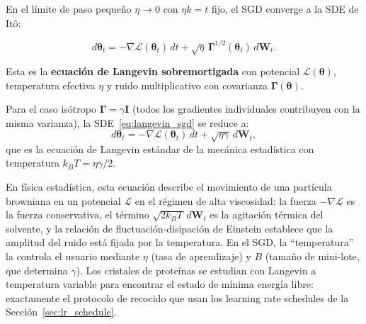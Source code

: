 En el límite de paso pequeño $\eta \to 0$ con $\eta k = t$ fijo, el SGD
converge a la SDE de Itô:

\begin{equation}
  \label{eq:langevin_sgd}
  \boxed{d\bm{\theta}_t
  = -\nabla\mathcal{L}(\bm{\theta}_t)\,dt
  + \sqrt{\eta}\,\bm{\Gamma}^{1/2}(\bm{\theta}_t)\,d\bm{W}_t.}
\end{equation}

Esta es la \textbf{ecuación de Langevin sobremortigada} con potencial
$\mathcal{L}(\bm{\theta})$, temperatura efectiva $\eta$ y ruido
multiplicativo con covarianza $\bm{\Gamma}(\bm{\theta})$.

Para el caso isótropo $\bm{\Gamma} = \gamma\bm{I}$ (todos los gradientes
individuales contribuyen con la misma varianza), la
SDE~\eqref{eq:langevin_sgd} se reduce a:
\begin{equation}
  d\bm{\theta}_t = -\nabla\mathcal{L}(\bm{\theta}_t)\,dt
  + \sqrt{\eta\gamma}\,d\bm{W}_t,
  \label{eq:langevin_isotropo}
\end{equation}
que es la ecuación de Langevin estándar de la mecánica estadística con
temperatura $k_BT = \eta\gamma/2$.

En física estadística, esta ecuación describe el movimiento de una
partícula browniana en un potencial $\mathcal{L}$ en el régimen de alta
viscosidad: la fuerza $-\nabla\mathcal{L}$ es la fuerza conservativa, el
término $\sqrt{2k_BT}\,d\bm{W}_t$ es la agitación térmica del solvente,
y la relación de fluctuación-disipación de Einstein establece que la
amplitud del ruido está fijada por la temperatura. En el SGD, la
``temperatura'' la controla el usuario mediante $\eta$ (tasa de
aprendizaje) y $B$ (tamaño de mini-lote, que determina $\gamma$). Los
cristales de proteínas se estudian con Langevin a temperatura variable
para encontrar el estado de mínima energía libre: exactamente el protocolo
de recocido que usan los learning rate schedules de la
Sección~\ref{sec:lr_schedule}.

